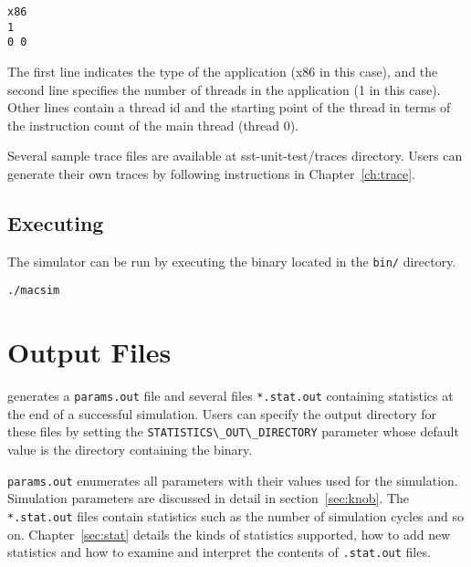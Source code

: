 \begin{Verbatim}
x86
1
0 0
\end{Verbatim}

\noindent The first line indicates the type of the application (x86 in this case),
and the second line specifies the number of threads in the application (1 in this case).
Other lines contain a thread id and the starting point of the thread in terms of the
instruction count of the main thread (thread 0).

Several sample trace files are available at sst-unit-test/traces directory.
Users can generate their own traces by following instructions in
Chapter~\ref{ch:trace}.

\subsection*{Executing}

The \SIM simulator can be run by executing the \bin binary located in the
\Verb+bin/+ directory.

\begin{Verbatim}
./macsim
\end{Verbatim}



\section{Output Files}

\SIM generates a \Verb+params.out+ file and several files \Verb+*.stat.out+
containing statistics at the end of a successful simulation. Users can specify
the output directory for these files by setting the
\Verb+STATISTICS\_OUT\_DIRECTORY+ parameter whose default value is the
directory containing the \bin binary.


\noindent \Verb+params.out+ enumerates all parameters with their values used
for the simulation. Simulation parameters are discussed in detail in 
section~\ref{sec:knob}. The \Verb+*.stat.out+ files contain statistics such as the number
of simulation cycles and so on. Chapter~\ref{sec:stat} details the kinds of
statistics supported, how to add new statistics and how to examine and
interpret the contents of \Verb+.stat.out+ files.


